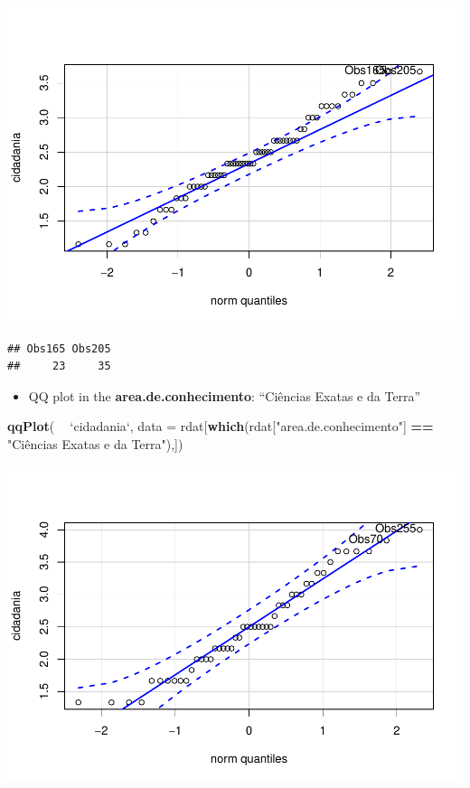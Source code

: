 \documentclass[]{article}
\newenvironment{Shaded}{\begin{snugshade}}{\end{snugshade}}
\newcommand{\DataTypeTok}[1]{\textcolor[rgb]{0.13,0.29,0.53}{#1}}
\newcommand{\KeywordTok}[1]{\textcolor[rgb]{0.13,0.29,0.53}{\textbf{#1}}}
\newcommand{\NormalTok}[1]{#1}
\newcommand{\OperatorTok}[1]{\textcolor[rgb]{0.81,0.36,0.00}{\textbf{#1}}}
\newcommand{\StringTok}[1]{\textcolor[rgb]{0.31,0.60,0.02}{#1}}
\providecommand{\tightlist}{%
  \setlength{\itemsep}{0pt}\setlength{\parskip}{0pt}}
\begin{document}
\includegraphics{factorialAnova_files/figure-latex/unnamed-chunk-11-1.pdf}

\begin{verbatim}
## Obs165 Obs205 
##     23     35
\end{verbatim}

\begin{itemize}
\tightlist
\item
  QQ plot in the \textbf{area.de.conhecimento}: ``Ciências Exatas e da
  Terra''
\end{itemize}

\begin{Shaded}
\begin{Highlighting}[]
\KeywordTok{qqPlot}\NormalTok{( }\OperatorTok{~}\StringTok{ `}\DataTypeTok{cidadania}\StringTok{`}\NormalTok{, }\DataTypeTok{data =}\NormalTok{ rdat[}\KeywordTok{which}\NormalTok{(rdat[}\StringTok{"area.de.conhecimento"}\NormalTok{] }\OperatorTok{==}\StringTok{ "Ciências Exatas e da Terra"}\NormalTok{),])}
\end{Highlighting}
\end{Shaded}

\includegraphics{factorialAnova_files/figure-latex/unnamed-chunk-12-1.pdf}
\end{document}
